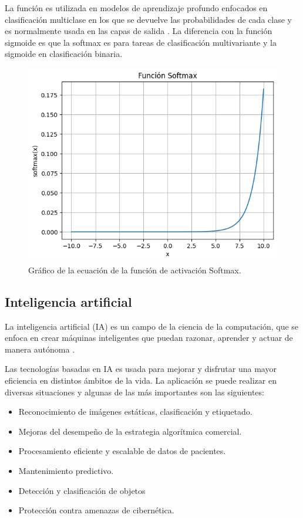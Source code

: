 La función es utilizada en modelos de aprendizaje profundo enfocados en clasificación multiclase en los que se devuelve las probabilidades de cada clase y es normalmente usada en  las capas de salida \citep{krizhevsky2012imagenet}. La diferencia con la función sigmoide es que la softmax es para tareas de clasificación multivariante y la sigmoide en clasificación binaria.

\begin{figure}[!h]
    \centering
    \includegraphics[width=.4\textwidth]{Imagenes/Func_softmax.png}
    \caption{Gráfico de la ecuación de la función de activación Softmax.}
    \label{fig:fun_softmax}
\end{figure}

\subsection{Inteligencia artificial}

La inteligencia artificial (IA) es un campo de la ciencia de la computación, que se enfoca en crear máquinas inteligentes que puedan razonar, aprender y actuar de manera autónoma \citep{rouhiainen2018inteligencia}.

Las tecnologías basadas en IA es usada para mejorar y disfrutar una mayor eficiencia en distintos ámbitos de la vida. La aplicación se puede realizar en diversas situaciones y algunas de las más importantes son las siguientes:

\begin{itemize}
    \item Reconocimiento de imágenes estáticas, clasificación y etiquetado.
    \item Mejoras del desempeño de la estrategia algorítmica comercial.
    \item Procesamiento eficiente y escalable de datos de pacientes.
    \item Mantenimiento predictivo.
    \item Detección y clasificación de objetos
    \item Protección contra amenazas de cibernética.
\end{itemize}

